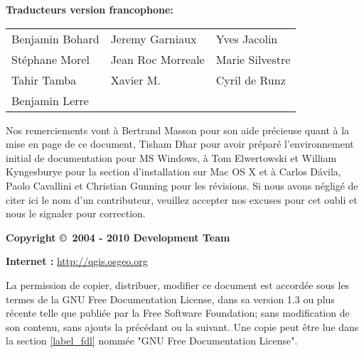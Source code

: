 \begin{flushleft}
\textbf{Traducteurs version francophone:}
  \par\bigskip\noindent
\begin{tabular}{p{4cm} p{4cm} p{4cm}}
Benjamin Bohard & Jeremy Garniaux & Yves Jacolin \\
Stéphane Morel & Jean Roc Morreale & Marie Silvestre \\
Tahir Tamba & Xavier M. & Cyril de Runz \\
Benjamin Lerre \\
\end{tabular}
\end{flushleft}

Nos remerciements vont à Bertrand Masson pour son aide précieuse quant à la mise en page de ce document, Tisham Dhar pour avoir préparé l'environnement initial de documentation pour MS Windows, à Tom Elwertowski et William Kyngesburye pour la section d'installation sur Mac OS X et à Carlos  D\'{a}vila, Paolo Cavallini et Christian Gunning pour les révisions. Si nous avons négligé de citer ici le nom d'un contributeur, veuillez accepter nos excuses pour cet oubli et nous le signaler pour correction.
\par\bigskip\noindent
\textbf{Copyright \copyright~2004 - 2010 \QG Development Team}
\par\bigskip\noindent
\textbf{Internet :} \url{http://qgis.osgeo.org}


La permission de copier, distribuer, modifier ce document est accordée sous les termes de la GNU Free Documentation License, dans sa version 1.3 ou plus récente telle que publiée par la Free Software Foundation; sans modification de son contenu, sans ajouts la précédant ou la suivant. Une copie peut être lue dans la section \ref{label_fdl} nommée "GNU Free Documentation License".

\newpage

